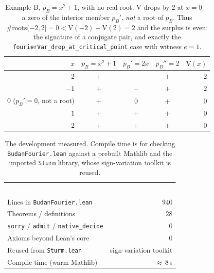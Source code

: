 \documentclass[11pt]{article}
\newcommand{\lean}[1]{\texttt{#1}}
\newcommand{\V}{\mathrm{V}}
\begin{document}
\begin{table}[H]
\centering\small
{}
\begin{tabular}{@{}rcccr@{}}
\toprule
\rowcolor{ggteal!18}
$x$ & $p_B=x^2{+}1$ & $p_B'=2x$ & $p_B''=2$ & $\V(x)$ \\
\midrule
$-2$            & $+$ & $-$ & $+$ & $2$ \\
$-1$            & $+$ & $-$ & $+$ & $2$ \\
$0$ {\scriptsize($p_B'{=}0$, not a root)} & $+$ & $0$ & $+$ & $0$ \\
$1$             & $+$ & $+$ & $+$ & $0$ \\
$2$             & $+$ & $+$ & $+$ & $0$ \\
\bottomrule
\end{tabular}
\caption{Example B, $p_B=x^2+1$, with no real root. $\V$ drops by $2$ at $x=0$---a zero of the
interior member $p_B'$, \emph{not} a root of $p_B$. Thus $\#\mathrm{roots}(-2,2]=0<\V(-2)-\V(2)=2$
and the surplus is even: the signature of a conjugate pair, and exactly the
\lean{fourierVar\_drop\_at\_critical\_point} case with witness $e=1$.}
\label{tab:signsB}
\end{table}

\begin{table}[H]
  \centering\small
  \begin{tabular}{@{}lr@{}}
    \toprule
    \rowcolor{ggteal}
    \textcolor{white}{\textbf{Quantity}} & \textcolor{white}{\textbf{Value}} \\
    \midrule
    \rowcolor{ggband}
    Lines in \lean{BudanFourier.lean} & $940$ \\
    Theorems / definitions & $28$ \\
    \rowcolor{ggband}
    \lean{sorry} / \lean{admit} / \lean{native\_decide} & $0$ \\
    Axioms beyond Lean's core & $0$ \\
    \rowcolor{ggband}
    Reused from \lean{Sturm.lean} & sign-variation toolkit \\
    Compile time (warm Mathlib) & ${\approx}\,8$\,s \\
    \bottomrule
  \end{tabular}
  \caption{The development measured. Compile time is for checking \lean{BudanFourier.lean} against a
  prebuilt Mathlib and the imported \lean{Sturm} library, whose sign-variation toolkit is reused.}
  \label{tab:metrics}
\end{table}
\end{document}
